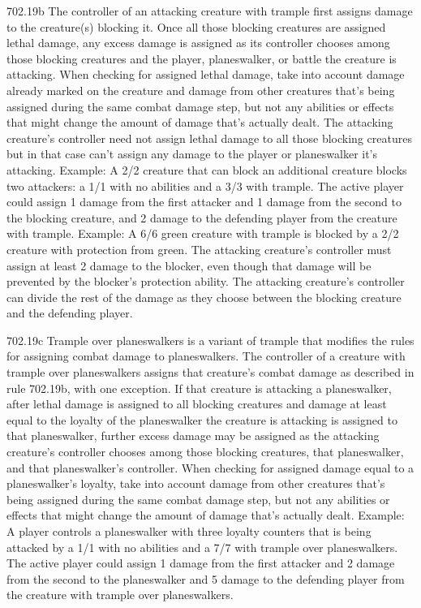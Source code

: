 702.19b The controller of an attacking creature with trample first assigns damage to the creature(s) blocking it. Once all those blocking creatures are assigned lethal damage, any excess damage is assigned as its controller chooses among those blocking creatures and the player, planeswalker, or battle the creature is attacking. When checking for assigned lethal damage, take into account damage already marked on the creature and damage from other creatures that’s being assigned during the same combat damage step, but not any abilities or effects that might change the amount of damage that’s actually dealt. The attacking creature’s controller need not assign lethal damage to all those blocking creatures but in that case can’t assign any damage to the player or planeswalker it’s attacking.
Example: A 2/2 creature that can block an additional creature blocks two attackers: a 1/1 with no abilities and a 3/3 with trample. The active player could assign 1 damage from the first attacker and 1 damage from the second to the blocking creature, and 2 damage to the defending player from the creature with trample.
Example: A 6/6 green creature with trample is blocked by a 2/2 creature with protection from green. The attacking creature’s controller must assign at least 2 damage to the blocker, even though that damage will be prevented by the blocker’s protection ability. The attacking creature’s controller can divide the rest of the damage as they choose between the blocking creature and the defending player.

702.19c Trample over planeswalkers is a variant of trample that modifies the rules for assigning combat damage to planeswalkers. The controller of a creature with trample over planeswalkers assigns that creature’s combat damage as described in rule 702.19b, with one exception. If that creature is attacking a planeswalker, after lethal damage is assigned to all blocking creatures and damage at least equal to the loyalty of the planeswalker the creature is attacking is assigned to that planeswalker, further excess damage may be assigned as the attacking creature’s controller chooses among those blocking creatures, that planeswalker, and that planeswalker’s controller. When checking for assigned damage equal to a planeswalker’s loyalty, take into account damage from other creatures that’s being assigned during the same combat damage step, but not any abilities or effects that might change the amount of damage that’s actually dealt.
Example: A player controls a planeswalker with three loyalty counters that is being attacked by a 1/1 with no abilities and a 7/7 with trample over planeswalkers. The active player could assign 1 damage from the first attacker and 2 damage from the second to the planeswalker and 5 damage to the defending player from the creature with trample over planeswalkers.

